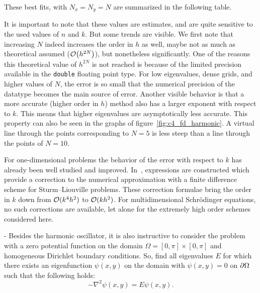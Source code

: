 These best fits, with $N_x = N_y = N$ are summarized in the following table.
\begin{center}
    
\end{center}

It is important to note that these values are estimates, and are quite sensitive to the used values of $n$ and $k$. But some trends are visible. We first note that increasing $N$ indeed increases the order in $h$ as well, maybe not as much as theoretical assumed ($\OO\mleft(h^{2N}\mright)$), but nonetheless significantly. One of the reasons this theoretical value of $h^{2N}$ is not reached is because of the limited precision available in the \texttt{double} floating point type. For low eigenvalues, dense grids, and higher values of $N$, the error is so small that the numerical precision of the datatype becomes the main source of error. Another visible behavior is that a more accurate (higher order in $h$) method also has a larger exponent with respect to $k$. This means that higher eigenvalues are asymptotically less accurate. This property can also be seen in the graphs of figure~\ref{fig:c4_fd_harmonic}. A virtual line through the points corresponding to $N = 5$ is less steep than a line through the points of $N = 10$.

For one-dimensional problems the behavior of the error with respect to $k$ has already been well studied and improved. In~\cite{paine_correction_1981}, expressions are constructed which provide a correction to the numerical approximation with a finite difference scheme for Sturm--Liouville problems. These correction formulae bring the order in $k$ down from $\operatorname{\mathcal{O}}(k^4h^2)$ to $\operatorname{\mathcal{O}}(k h^2)$. For multidimensional Schrödinger equations, no such corrections are available, let alone for the extremely high order schemes considered here.

-
Besides the harmonic oscillator, it is also instructive to consider the problem with a zero potential function on the domain $\Omega = [0, \pi] \times [0, \pi]$ and homogeneous Dirichlet boundary conditions. So, find all eigenvalues $E$ for which there exists an eigenfunction $\psi(x, y)$ on the domain with $\psi(x, y) = 0$ on $\partial\Omega$ such that the following holds:
\begin{equation}\label{equ:c4_fd_zero}
    -\nabla^2 \psi(x, y) = E \psi(x, y) \text{.}
\end{equation}

